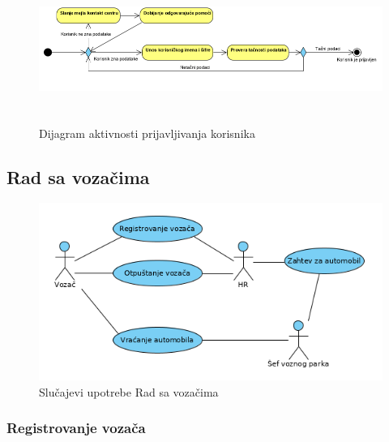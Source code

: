 \begin{figure}[H]
\begin{center}
\includegraphics[width=480pt,height=135pt]{Slike/PrijavljivanjeKorisnika.png}
\end{center}
    \caption{Dijagram aktivnosti prijavljivanja korisnika}
\label{fig:PrijavljivanjeKorisnika}
\end{figure}

\subsection{\bfseries Rad sa vozačima}

\begin{figure}[H]
\begin{center}
\includegraphics[width=\textwidth]{Slike/RadSaVozacimaUseCase.png}
\end{center}
    \caption{Slučajevi upotrebe Rad sa vozačima}
\label{fig:contextDiagram}
\end{figure}


\subsubsection{\bfseries Registrovanje vozača}

